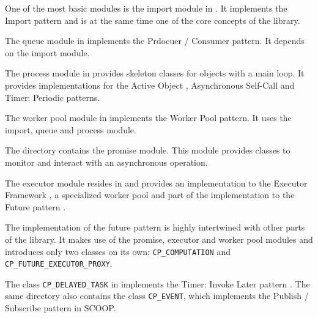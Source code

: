 One of the most basic modules is the import module in .
It implements the Import  pattern  and is at the same time one of the core concepts of the library.

The queue module in  implements the Prdocuer / Consumer  pattern.
It depends on the import module.

The process module in  provides skeleton classes for objects with a main loop.
It provides implementations for the Active Object , Asynchronous Self-Call  and Timer: Periodic  patterns.

The worker pool module in  implements the Worker Pool  pattern.
It uses the import, queue and process module.

The directory  contains the promise module.
This module provides classes to monitor and interact with an asynchronous operation.

The executor module resides in  and provides an implementation to the Executor Framework , 
a specialized worker pool and part of the implementation to the Future pattern .

The implementation of the future pattern is highly intertwined with other parts of the library.
It makes use of the promise, executor and worker pool modules and introduces only two classes on its own:
\lstinline!CP_COMPUTATION! and \lstinline!CP_FUTURE_EXECUTOR_PROXY!.

The class \lstinline!CP_DELAYED_TASK! in  implements the Timer: Invoke Later pattern .
The same directory also contains the class \lstinline!CP_EVENT!, which implements the Publish / Subscribe pattern  in SCOOP.

